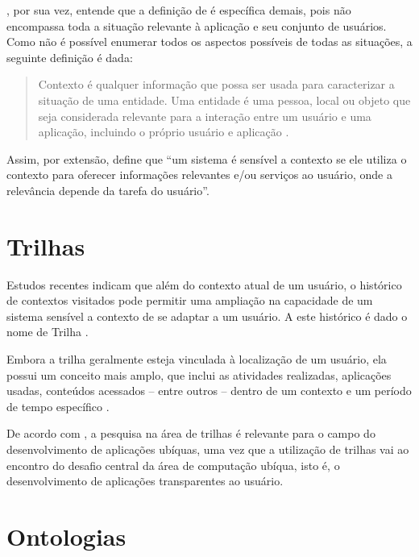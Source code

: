 , por sua vez, entende que a definição de  é específica demais, pois não encompassa toda a situação relevante à aplicação e seu conjunto de usuários. Como não é possível enumerar todos os aspectos possíveis de todas as situações, a seguinte definição é dada:

\begin{quotation}
Contexto é qualquer informação que possa ser usada para caracterizar a situação de uma entidade. Uma entidade é uma pessoa, local ou objeto que seja considerada relevante para a interação entre um usuário e uma aplicação, incluindo o próprio usuário e aplicação \cite{dey2001}.
\end{quotation}

Assim, por extensão,  define que ``um sistema é sensível a contexto se ele utiliza o contexto para oferecer informações relevantes e/ou serviços ao usuário, onde a relevância depende da tarefa do usuário''.


\section{Trilhas}
\label{sec:trilhas}

Estudos recentes indicam que além do contexto atual de um usuário, o histórico de contextos visitados pode permitir uma ampliação na capacidade de um sistema sensível a contexto de se adaptar a um usuário. A este histórico é dado o nome de Trilha \cite{silva10,driver08,clarke04}.

Embora a trilha geralmente esteja vinculada à localização de um usuário, ela possui um conceito mais amplo, que inclui as atividades realizadas, aplicações usadas, conteúdos acessados -- entre outros -- dentro de um contexto e um período de tempo específico \cite{silva10}.

De acordo com , a pesquisa na área de trilhas é relevante para o campo do desenvolvimento de aplicações ubíquas, uma vez que a utilização de trilhas vai ao encontro do desafio central da área de computação ubíqua, isto é, o desenvolvimento de aplicações transparentes ao usuário.


\section{Ontologias}

